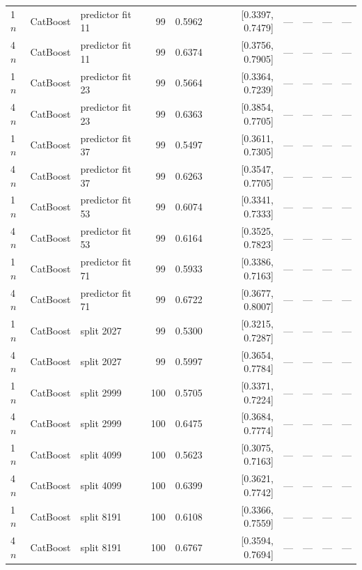 \begin{longtable}{lllrrrrllr}
1$n$ & CatBoost & predictor fit 11 & 99 & 0.5962 & [0.3397, 0.7479] & --- & --- & --- & --- \\
4$n$ & CatBoost & predictor fit 11 & 99 & 0.6374 & [0.3756, 0.7905] & --- & --- & --- & --- \\
1$n$ & CatBoost & predictor fit 23 & 99 & 0.5664 & [0.3364, 0.7239] & --- & --- & --- & --- \\
4$n$ & CatBoost & predictor fit 23 & 99 & 0.6363 & [0.3854, 0.7705] & --- & --- & --- & --- \\
1$n$ & CatBoost & predictor fit 37 & 99 & 0.5497 & [0.3611, 0.7305] & --- & --- & --- & --- \\
4$n$ & CatBoost & predictor fit 37 & 99 & 0.6263 & [0.3547, 0.7705] & --- & --- & --- & --- \\
1$n$ & CatBoost & predictor fit 53 & 99 & 0.6074 & [0.3341, 0.7333] & --- & --- & --- & --- \\
4$n$ & CatBoost & predictor fit 53 & 99 & 0.6164 & [0.3525, 0.7823] & --- & --- & --- & --- \\
1$n$ & CatBoost & predictor fit 71 & 99 & 0.5933 & [0.3386, 0.7163] & --- & --- & --- & --- \\
4$n$ & CatBoost & predictor fit 71 & 99 & 0.6722 & [0.3677, 0.8007] & --- & --- & --- & --- \\
1$n$ & CatBoost & split 2027 & 99 & 0.5300 & [0.3215, 0.7287] & --- & --- & --- & --- \\
4$n$ & CatBoost & split 2027 & 99 & 0.5997 & [0.3654, 0.7784] & --- & --- & --- & --- \\
1$n$ & CatBoost & split 2999 & 100 & 0.5705 & [0.3371, 0.7224] & --- & --- & --- & --- \\
4$n$ & CatBoost & split 2999 & 100 & 0.6475 & [0.3684, 0.7774] & --- & --- & --- & --- \\
1$n$ & CatBoost & split 4099 & 100 & 0.5623 & [0.3075, 0.7163] & --- & --- & --- & --- \\
4$n$ & CatBoost & split 4099 & 100 & 0.6399 & [0.3621, 0.7742] & --- & --- & --- & --- \\
1$n$ & CatBoost & split 8191 & 100 & 0.6108 & [0.3366, 0.7559] & --- & --- & --- & --- \\
4$n$ & CatBoost & split 8191 & 100 & 0.6767 & [0.3594, 0.7694] & --- & --- & --- & --- \\
\bottomrule
\end{longtable}
